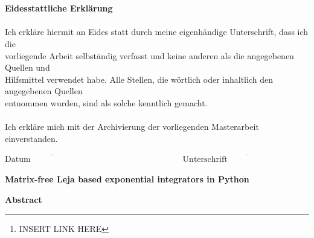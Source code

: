 \documentclass{scrartcl}
\begin{document}
{\begin{figure}[!htp]
\begin{flushright}
		\end{flushright}
	\end{figure}\\\\
	{\Large\textbf{Eidesstattliche Erklärung}}\\\\
	Ich erkläre hiermit an Eides statt durch meine eigenhändige Unterschrift, dass ich die\\ vorliegende Arbeit selbständig verfasst und keine anderen als die angegebenen Quellen und\\ Hilfsmittel verwendet habe. Alle Stellen, die wörtlich oder inhaltlich den angegebenen Quellen \\entnommen wurden, sind als solche kenntlich gemacht.\\\\
	Ich erkläre mich mit der Archivierung der vorliegenden Masterarbeit einverstanden.
	\vspace{40pt}\\
	\begin{center}
		\ensuremath{\overline{\mbox{Datum}\hspace{8em}}
			\hspace{10em}
			\overline{\mbox{Unterschrift}\hspace{10em}}
		}
		\thispagestyle{empty}
\end{center}}
\pagebreak
	
\begin{center}\textbf{\Huge Matrix-free Leja based exponential integrators in Python}\end{center}
\begin{center}\textbf{Abstract}\end{center}
\begin{abstract}
	In this master thesis we develop an algorithm to approximate the action of a matrix exponential function for matrix-free linear operators. This is achieved by using a modified version of the real Leja method. We choose optimal interpolation parameters based on a spectral radius estimate computed by the power method. With this procedure we construct exponential Rosenbrock-type integrators to solve stiff advection-diffusion-reaction equations. We compare the performance of these integrators with other matrix-free differential equation solvers. 
		As part of this thesis we publish the code for the matrix-free Leja method for the action of the matrix exponential function on GitHub \footnote{INSERT LINK HERE}.
\end{abstract}
\setcounter{page}{1}
	
\end{document}
